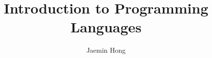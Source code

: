 \documentclass[
	fontsize=10pt, %
	twoside=false, %
	numbers=noenddot, %
]{kaobook}
\begin{document}


\title{Introduction to Programming Languages}

\author{Jaemin Hong}

\date{}



\frontmatter %




\makeatletter
\uppertitleback{\@titlehead} %
\end{document}
